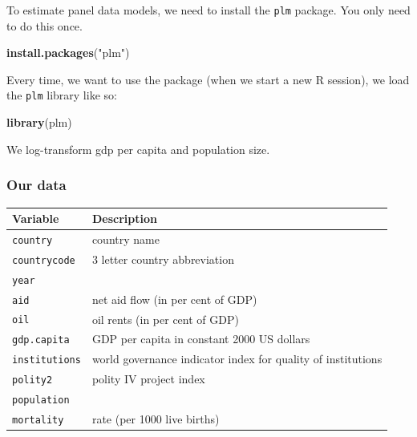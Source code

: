 \documentclass[]{article}
\newenvironment{Shaded}{\begin{snugshade}}{\end{snugshade}}
\newcommand{\KeywordTok}[1]{\textcolor[rgb]{0.13,0.29,0.53}{\textbf{#1}}}
\newcommand{\StringTok}[1]{\textcolor[rgb]{0.31,0.60,0.02}{#1}}
\newcommand{\OperatorTok}[1]{\textcolor[rgb]{0.81,0.36,0.00}{\textbf{#1}}}
\newcommand{\NormalTok}[1]{#1}
\theoremstyle{definition}
\theoremstyle{definition}
\theoremstyle{definition}
\theoremstyle{remark}
\begin{document}
To estimate panel data models, we need to install the \texttt{plm}
package. You only need to do this once.

\begin{Shaded}
\begin{Highlighting}[]
\KeywordTok{install.packages}\NormalTok{(}\StringTok{"plm"}\NormalTok{)}
\end{Highlighting}
\end{Shaded}

Every time, we want to use the package (when we start a new R session),
we load the \texttt{plm} library like so:

\begin{Shaded}
\begin{Highlighting}[]
\KeywordTok{library}\NormalTok{(plm)}
\end{Highlighting}
\end{Shaded}

We log-transform gdp per capita and population size.

\begin{Shaded}
\end{Shaded}

\subsubsection{Our data}\label{our-data}

\begin{longtable}[]{@{}ll@{}}
\toprule
Variable & Description\tabularnewline
\midrule
\endhead
\texttt{country} & country name\tabularnewline
\texttt{countrycode} & 3 letter country abbreviation\tabularnewline
\texttt{year} &\tabularnewline
\texttt{aid} & net aid flow (in per cent of GDP)\tabularnewline
\texttt{oil} & oil rents (in per cent of GDP)\tabularnewline
\texttt{gdp.capita} & GDP per capita in constant 2000 US
dollars\tabularnewline
\texttt{institutions} & world governance indicator index for quality of
institutions\tabularnewline
\texttt{polity2} & polity IV project index\tabularnewline
\texttt{population} &\tabularnewline
\texttt{mortality} & rate (per 1000 live births)\tabularnewline
\bottomrule
\end{longtable}
\end{document}
